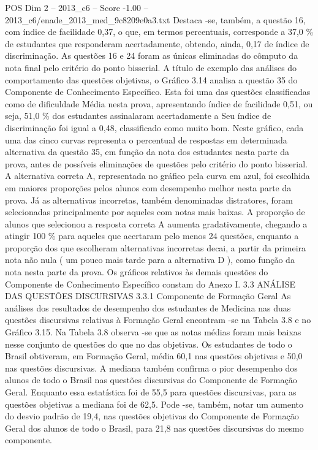 \begin{textsample}{POS Dim 2 – 2013\_c6 – Score -1.00 – 2013\_c6/enade\_2013\_med\_9c8209e0a3.txt}
Destaca -se, também, a questão 16, com índice de facilidade 0,37, o que, em termos percentuais, corresponde a 37,0 \% de estudantes que responderam acertadamente, obtendo, ainda, 0,17 de índice de discriminação.
As questões 16 e 24 foram as únicas eliminadas do cômputo da nota final pelo critério do ponto bisserial.
A título de exemplo das análises do comportamento das questões objetivas, o Gráfico 3.14 analisa a questão 35 do Componente de Conhecimento Específico.
Esta foi uma das questões classificadas como de dificuldade Média nesta prova, apresentando índice de facilidade 0,51, ou seja, 51,0 \% dos estudantes assinalaram acertadamente a Seu índice de discriminação foi igual a 0,48, classificado como muito bom.
Neste gráfico, cada uma das cinco curvas representa o percentual de respostas em determinada alternativa da questão 35, em função da nota dos estudantes nesta parte da prova, antes de possíveis eliminações de questões pelo critério do ponto bisserial.
A alternativa correta A, representada no gráfico pela curva em azul, foi escolhida em maiores proporções pelos alunos com desempenho melhor nesta parte da prova.
Já as alternativas incorretas, também denominadas distratores, foram selecionadas principalmente por aqueles com notas mais baixas.
A proporção de alunos que selecionou a resposta correta A aumenta gradativamente, chegando a atingir 100 \% para aqueles que acertaram pelo menos 24 questões, enquanto a proporção dos que escolheram alternativas incorretas decai, a partir da primeira nota não nula ( um pouco mais tarde para a alternativa D ), como função da nota nesta parte da prova.
Os gráficos relativos às demais questões do Componente de Conhecimento Específico constam do Anexo I. 3.3 ANÁLISE DAS QUESTÕES DISCURSIVAS 3.3.1 Componente de Formação Geral As análises dos resultados de desempenho dos estudantes de Medicina nas duas questões discursivas relativas à Formação Geral encontram -se na Tabela 3.8 e no Gráfico 3.15.
Na Tabela 3.8 observa -se que as notas médias foram mais baixas nesse conjunto de questões do que no das objetivas.
Os estudantes de todo o Brasil obtiveram, em Formação Geral, média 60,1 nas questões objetivas e 50,0 nas questões discursivas.
A mediana também confirma o pior desempenho dos alunos de todo o Brasil nas questões discursivas do Componente de Formação Geral.
Enquanto essa estatística foi de 55,5 para questões discursivas, para as questões objetivas a mediana foi de 62,5.
Pode -se, também, notar um aumento do desvio padrão de 19,4, nas questões objetivas do Componente de Formação Geral dos alunos de todo o Brasil, para 21,8 nas questões discursivas do mesmo componente.

\end{textsample}

